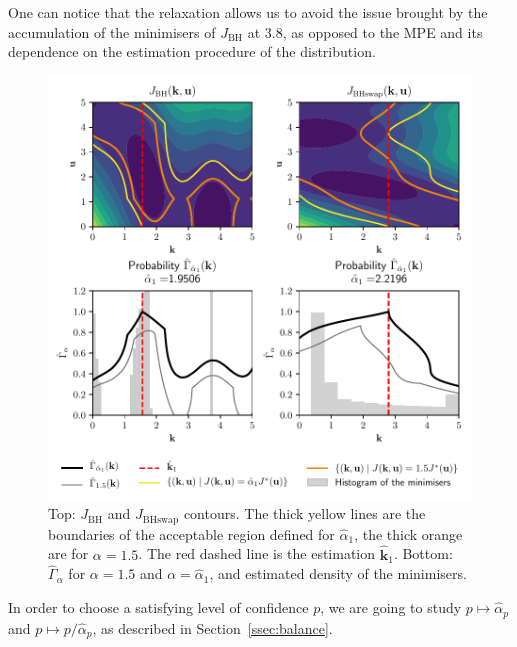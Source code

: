\documentclass[preprint, review, 1p]{elsarticle}
\newcommand{\Ex}{\mathbb{E}}
\newcommand{\hatkmean}{\hat{\mathbf{k}}_{\Ex}}
\newcommand{\hatkvar}{\hat{\mathbf{k}}_{\mathbb{V}}}
\newcommand{\checka}{{\alpha}}
\newcommand{\checkk}{\mathbf{k}}
\newcommand{\JBH}{J_{\mathrm{BH}}}
\newcommand{\JBHS}{J_{\mathrm{BHswap}}}
\newlength{\onehalfcolumn}
\begin{document}
One can notice that the relaxation allows us to avoid the issue brought by the accumulation of the minimisers of $\JBH$ at $3.8$, as opposed to the MPE and its dependence on the estimation procedure of the distribution.

\begin{figure}[!ht]
  \centering
  \includegraphics[width=\onehalfcolumn]{Figures/FIG05.pdf}
\caption{Top: $\JBH$ and $\JBHS$ contours. The thick yellow lines are the boundaries of the acceptable region defined for $\hat{\checka}_1$, the thick orange are for $\alpha=1.5$. The red dashed line is the estimation $\hat{\checkk}_1$. Bottom: $\hat{\Gamma}_{\alpha}$ for $\alpha = 1.5$ and $\alpha=\hat{\checka}_1$, and estimated density of the minimisers.}
\label{fig:contour_alpha}
\end{figure}


In order to choose a satisfying level of confidence $p$, we are going to study $p\mapsto \hat{\checka}_p$ and $p\mapsto p/\hat{\checka}_p$, as described in Section~\ref{ssec:balance}.
\end{document}
